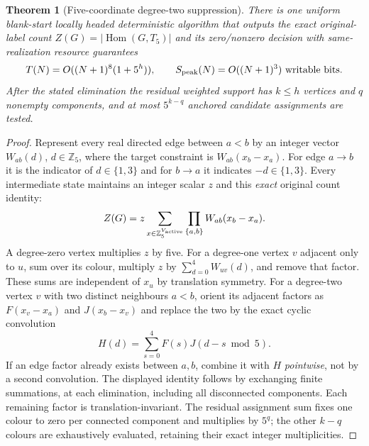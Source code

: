 \documentclass[11pt]{article}
\newtheorem{theorem}{Theorem}
\begin{document}
\begin{theorem}[Five-coordinate degree-two suppression]
There is one uniform blank-start locally headed deterministic
algorithm that outputs the exact original-label count
$Z(G)=|\operatorname{Hom}(G,T_5)|$ and its zero/nonzero decision
with same-realization resource guarantees
\[
 T(N)=O((N+1)^8(1+5^h)),\qquad
 S_{\rm peak}(N)=O((N+1)^3)\ {\rm writable\ bits}.
\]
After the stated elimination the residual weighted support has
$k\le h$ vertices and $q$ nonempty components, and at most
$5^{k-q}$ anchored candidate assignments are tested.
\end{theorem}
\begin{proof}
Represent every real directed edge between $a<b$ by an integer
vector $W_{ab}(d)$, $d\in\mathbb Z_5$, where the target constraint
is $W_{ab}(x_b-x_a)$. For edge $a\to b$ it is the indicator of
$d\in\{1,3\}$ and for $b\to a$ it indicates
$-d\in\{1,3\}$. Every intermediate state maintains an
integer scalar $z$ and this \emph{exact} original count identity:
\[
 Z(G)=z\sum_{x\in\mathbb Z_5^{V_{\rm active}}}
               \prod_{\{a,b\}}W_{ab}(x_b-x_a).
\]
A degree-zero vertex multiplies $z$ by five.
For a degree-one vertex $v$ adjacent only to $u$,
sum over its colour, multiply $z$ by
$\sum_{d=0}^4W_{uv}(d)$, and remove that factor.
These sums are independent of $x_u$ by translation symmetry.
For a degree-two vertex $v$ with two distinct neighbours
$a<b$, orient its adjacent factors as $F(x_v-x_a)$ and
$J(x_b-x_v)$ and replace the two by the exact cyclic convolution
\[
 H(d)=\sum_{s=0}^{4}F(s)J(d-s\bmod5).
\]
If an edge factor already exists between $a,b$, combine it
with $H$ \emph{pointwise}, not by a second convolution.
The displayed identity follows by exchanging finite summations,
at each elimination, including all disconnected components.
Each remaining factor is translation-invariant.
The residual assignment sum fixes one colour to zero per
connected component and multiplies by $5^q$; the other
$k-q$ colours are exhaustively evaluated, retaining their
exact integer multiplicities.


\end{proof}
\end{document}
